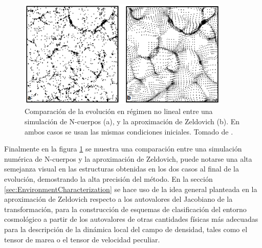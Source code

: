 \
\begin{figure}[htbp]
	\centering
	\includegraphics[width=0.9\textwidth]
	{./figures/2_theoretical_framework/Zeldovich_Approximation.png}

	\caption{\small{Comparación de la evolución en régimen no lineal entre
	una simulación de N-cuerpos (a), y la aproximación de Zeldovich (b).
	En ambos casos se usan las mismas condiciones iniciales. Tomado de 
	\cite{longair2008}. }}
	
	\label{fig:ZeldovichComparison}
\end{figure}


Finalmente en la figura \ref{fig:ZeldovichComparison} se muestra una 
comparación entre una simulación numérica de N-cuerpos y la aproximación 
de Zeldovich, puede notarse una alta semejanza visual en las estructuras 
obtenidas en los dos casos al final de la evolución, demostrando la alta 
precisión del método. En la sección \ref{sec:EnvironmentCharacterization}
se hace uso de la idea general planteada en la aproximación de Zeldovich 
respecto a los autovalores del Jacobiano de la transformación, para la 
construcción de esquemas de clasificación del entorno cosmológico a partir 
de los autovalores de otras cantidades físicas más adecuadas para la 
descripción de la dinámica local del campo de densidad, tales como el 
tensor de marea o el tensor de velocidad peculiar.


